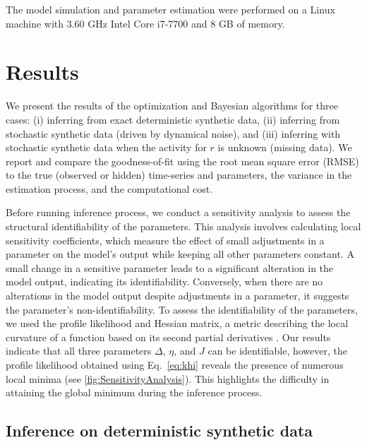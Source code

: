 \documentclass[preprint,11pt,authoryear]{elsarticle}
\begin{document}
The model simulation and parameter estimation were performed on a Linux machine with 3.60 GHz Intel Core i7-7700 and 8 GB of memory.






\section{Results}
\label{Results}

We present the results of the optimization and Bayesian algorithms for three cases: (i) inferring from exact deterministic synthetic data, (ii) inferring from stochastic synthetic data (driven by dynamical noise), and (iii) inferring with stochastic synthetic data when the activity for $r$ is unknown (missing data).  We report and compare the goodness-of-fit using the root mean square error (RMSE) to the true (observed or hidden) time-series and parameters, the variance in the estimation process, and the computational cost.



Before running inference process, we conduct a sensitivity analysis to assess the structural identifiability of the parameters. This analysis involves calculating local sensitivity coefficients, which measure the effect of small adjustments in a parameter on the model's output while keeping all other parameters constant. A small change in a sensitive parameter leads to a significant alteration in the model output, indicating its identifiability. Conversely, when there are no alterations in the model output despite adjustments in a parameter, it suggests the parameter's non-identifiability. To assess the identifiability of the parameters, we used the profile likelihood \citep{Raue2009, Wieland2021} and Hessian matrix, a metric describing the local curvature of a function based on its second partial derivatives \citep{Hashemi2018, Hashemi2023}. Our results indicate that all three parameters $\Delta$, $\eta$, and $J$ can be identifiable, however, the profile likelihood obtained using Eq.~\ref{eq:khi} reveals the presence of numerous local minima (see \autoref{fig:SensitivityAnalysis}). This highlights the difficulty in attaining the global minimum during the inference process.



\subsection{Inference on deterministic synthetic data}
\end{document}
